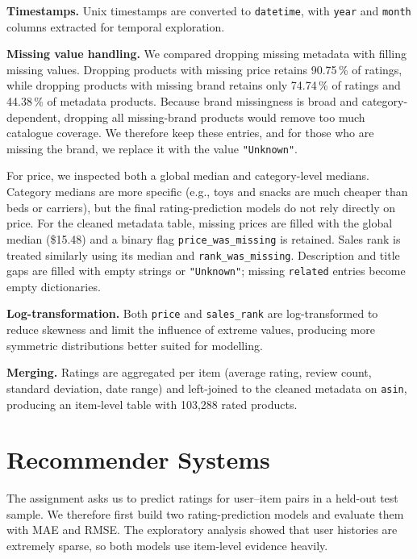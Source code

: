 \documentclass[11pt,a4paper]{article}
\begin{document}
\textbf{Timestamps.} Unix timestamps are converted to \texttt{datetime}, with \texttt{year} and \texttt{month} columns extracted for temporal exploration.
 
\textbf{Missing value handling.} We compared dropping missing metadata with filling missing values. Dropping products with missing price retains 90.75\,\% of ratings, while dropping products with missing brand retains only 74.74\,\% of ratings and 44.38\,\% of metadata products. Because brand missingness is broad and category-dependent, dropping all missing-brand products would remove too much catalogue coverage. We therefore keep these entries, and for those who are missing the brand, we replace it with the value \texttt{"Unknown"}.

For price, we inspected both a global median and category-level medians. Category medians are more specific (e.g., toys and snacks are much cheaper than beds or carriers), but the final rating-prediction models do not rely directly on price. For the cleaned metadata table, missing prices are filled with the global median (\$15.48) and a binary flag \texttt{price\_was\_missing} is retained. Sales rank is treated similarly using its median and \texttt{rank\_was\_missing}. Description and title gaps are filled with empty strings or \texttt{"Unknown"}; missing \texttt{related} entries become empty dictionaries.
 
\textbf{Log-transformation.} Both \texttt{price} and \texttt{sales\_rank} are log-transformed to reduce skewness and limit the influence of extreme values, producing more symmetric distributions better suited for modelling.
 
\textbf{Merging.} Ratings are aggregated per item (average rating, review count, standard deviation, date range) and left-joined to the cleaned metadata on \texttt{asin}, producing an item-level table with 103,288 rated products.
 
 
\section{Recommender Systems}
\label{sec:recommenders}

The assignment asks us to predict ratings for user--item pairs in a held-out test sample. We therefore first build two rating-prediction models and evaluate them with MAE and RMSE. The exploratory analysis showed that user histories are extremely sparse, so both models use item-level evidence heavily.
\end{document}
